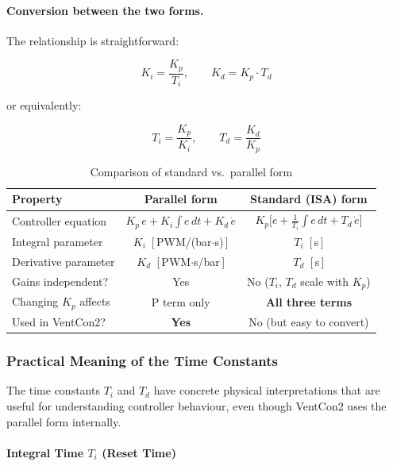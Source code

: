 \documentclass[12pt,a4paper]{article}
\begin{document}
\paragraph{Conversion between the two forms.}
The relationship is straightforward:

\begin{equation}
    K_i = \frac{K_p}{T_i}, \qquad K_d = K_p \cdot T_d
    \label{eq:form-conversion}
\end{equation}

\noindent
or equivalently:

\begin{equation}
    T_i = \frac{K_p}{K_i}, \qquad T_d = \frac{K_d}{K_p}
    \label{eq:form-conversion-inv}
\end{equation}

\begin{table}[H]
\centering
\caption{Comparison of standard vs.\ parallel form}
\label{tab:form-comparison}
\begin{tabular}{lcc}
\toprule
\textbf{Property} & \textbf{Parallel form} & \textbf{Standard (ISA) form} \\
\midrule
Controller equation     & $K_p\,e + K_i\!\int e\,dt + K_d\,\dot{e}$ & $K_p\bigl[e + \tfrac{1}{T_i}\!\int e\,dt + T_d\,\dot{e}\bigr]$ \\
Integral parameter      & $K_i$ \,[\,PWM/(bar$\cdot$s)\,] & $T_i$ \,[\,s\,] \\
Derivative parameter    & $K_d$ \,[\,PWM$\cdot$s/bar\,] & $T_d$ \,[\,s\,] \\
Gains independent?      & Yes & No ($T_i$, $T_d$ scale with $K_p$) \\
Changing $K_p$ affects   & P term only & \textbf{All three terms} \\
Used in VentCon2?       & \textbf{Yes} & No (but easy to convert) \\
\bottomrule
\end{tabular}
\end{table}

\subsubsection{Practical Meaning of the Time Constants}
\label{sec:time-constants-practical}

The time constants $T_i$ and $T_d$ have concrete physical interpretations that are useful for understanding controller behaviour, even though VentCon2 uses the parallel form internally.

\paragraph{Integral Time $T_i$ (Reset Time)}
\end{document}
